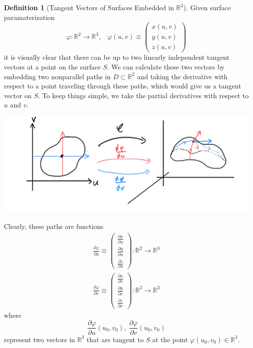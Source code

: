 \documentclass{article}
\theoremstyle{remark}
\theoremstyle{definition}
\newtheorem{definition}{Definition}[section]
\begin{document}
\begin{definition}[Tangent Vectors of Surfaces Embedded in $\mathbb{R}^3$]
Given surface paramaterization 
\[\varphi: \mathbb{R}^2 \longrightarrow \mathbb{R}^3, \;\;\; \varphi(u, v) \equiv \begin{pmatrix}
x (u, v) \\ y(u, v) \\ z(u, v) 
\end{pmatrix}\]
it is visually clear that there can be up to two linearly independent tangent vectors at a point on the surface $S$. We can calculate these two vectors by embedding two nonparallel paths in $D \subset \mathbb{R}^2$ and taking the derivative with respect to a point traveling through these paths, which would give us a tangent vector on $S$. To keep things simple, we take the partial derivatives with respect to $u$ and $v$. 
\begin{center}
    \includegraphics[scale=0.28]{img/Partial_Derivatives_with_respect_to_U_V.PNG}
\end{center}
Clearly, these paths are functions 
\begin{align*}
    \frac{\partial \varphi}{\partial u} \equiv \begin{pmatrix}
     \frac{\partial x}{\partial u} \\ \frac{\partial y}{\partial u} \\ \frac{\partial z}{\partial u}
    \end{pmatrix} : \mathbb{R}^2 \longrightarrow \mathbb{R}^3\\
    \frac{\partial \varphi}{\partial v} \equiv \begin{pmatrix}
     \frac{\partial x}{\partial v} \\ \frac{\partial y}{\partial v} \\ \frac{\partial z}{\partial v}
    \end{pmatrix} : \mathbb{R}^2 \longrightarrow \mathbb{R}^3
\end{align*}
where 
\[\frac{\partial \varphi}{\partial u} (u_0 ,v_0), \; \frac{\partial \varphi}{\partial v} (u_0, v_0)\]
represent two vectors in $\mathbb{R}^3$ that are tangent to $S$ at the point $\varphi(u_0, v_0) \in \mathbb{R}^3$. 
\end{definition}
\end{document}

